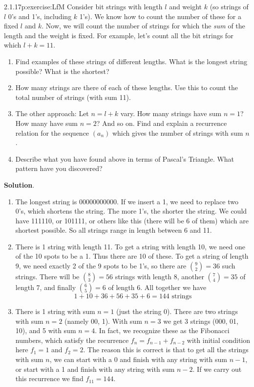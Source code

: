 \documentclass[twoside,11pt,]{book}
\newcommand{\blocktitlefont}{\relax}
\numberwithin{equation}{chapter}
\begin{document}
\begin{divisionsolution}{2.1.17}{}{p:exercise:LfM}%
Consider bit strings with length \(l\) and weight \(k\) (so strings of \(l\) 0's and 1's, including \(k\) 1's). We know how to count the number of these for a fixed \(l\) and \(k\). Now, we will count the number of strings for which the \emph{sum} of the length and the weight is fixed. For example, let's count all the bit strings for which \(l+k = 11\).%
\begin{enumerate}[label=(\alph*)]
\item{}Find examples of these strings of different lengths. What is the longest string possible? What is the shortest?%
\item{}How many strings are there of each of these lengths. Use this to count the total number of strings (with sum 11).%
\item{}The other approach: Let \(n = l+k\) vary. How many strings have sum \(n = 1\)? How many have sum \(n = 2\)? And so on. Find and explain a recurrence relation for the sequence \((a_n)\) which gives the number of strings with sum \(n\).%
\item{}Describe what you have found above in terms of Pascal's Triangle. What pattern have you discovered?%
\end{enumerate}
%
\par\smallskip%
\noindent\textbf{\blocktitlefont Solution}.\quad{}%
\begin{enumerate}[label=(\alph*)]
\item{}The longest string is 00000000000. If we insert a 1, we need to replace two 0's, which shortens the string. The more 1's, the shorter the string. We could have 111110, or 101111, or others like this (there will be 6 of them) which are shortest possible. So all strings range in length between 6 and 11.%
\item{}There is 1 string with length 11. To get a string with length 10, we need one of the 10 spots to be a 1. Thus there are 10 of these. To get a string of length 9, we need exactly 2 of the 9 spots to be 1's, so there are \({9 \choose 2} = 36\) such strings. There will be \({8 \choose 3} = 56\) strings with length 8, another \({7 \choose 4} = 35\) of length 7, and finally \({6 \choose 5} = 6\) of length 6. All together we have%
\begin{equation*}
1 + 10 + 36 + 56 + 35 + 6 = 144 \text{ strings}
\end{equation*}
%
\item{}There is 1 string with sum \(n = 1\) (just the string 0). There are two strings with sum \(n = 2\) (namely 00, 1). With sum \(n = 3\) we get 3 strings (000, 01, 10), and 5 with sum \(n = 4\). In fact, we recognize these as the Fibonacci numbers, which satisfy the recurrence \(f_n = f_{n-1} + f_{n-2}\) with initial condition here \(f_1 = 1\) and \(f_2 = 2\). The reason this is correct is that to get all the strings with sum \(n\), we can start with a 0 and finish with any string with sum \(n-1\), or start with a 1 and finish with any string with sum \(n - 2\). If we carry out this recurrence we find \(f_{11} = 144\).%

\end{enumerate}
\end{divisionsolution}
\end{document}

